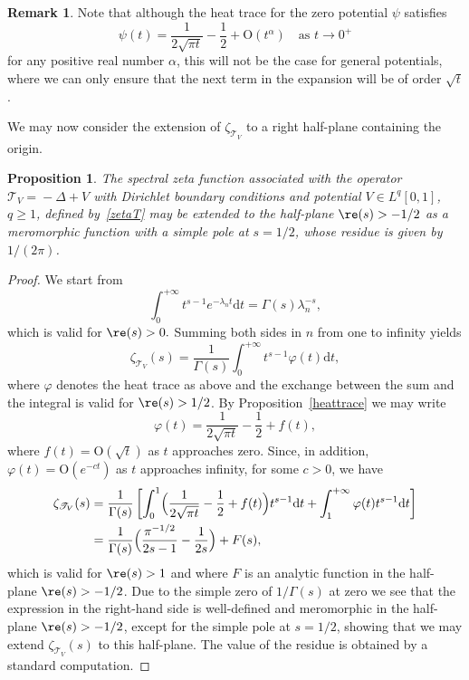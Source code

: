 \documentclass[JEP,XML,SOM,Unicode,NoEqCountersInSection,NoFloatCountersInSection]{cedram}
\theoremstyle{plain}
\newtheorem{prop}[theorem]{Proposition}
\theoremstyle{definition}
\newtheorem{remark}[theorem]{Remark}
\newcommand{\bo}{\mathrm{O}}
\newcommand{\ttt}{\mathscr{T}}
\renewcommand{\d}{\mathrm{d}}
\let\balpha q
\let\fr\frac
\begin{document}
\begin{remark}
Note that although the heat trace for the zero potential $\psi$ satisfies
\[
\psi(t)=\frac{1}{2\sqrt{\pi t}} - \frac{1}{2} + \bo(t^{\alpha}) \quad\text{as } t\to 0^{+}
\]
for any positive real number $\alpha$, this will not be the case for general potentials, where we can only ensure that the next term in the expansion
will be of order $\sqrt{t}$.
\end{remark}

We may now consider the extension of $\zeta_{\ttt_V}$ to a right half-plane containing the origin.

\begin{prop}\label{meromorphicext}
The spectral zeta function associated with the operator \hbox{$\!\ttt_V\!=\!-\Delta\!+\!V$} with Dirichlet boundary conditions and potential $V\in L^{\balpha}[0,1]$, $\balpha\geq 1$,
defined by~\eqref{zetaT} may be extended to the half-plane $\re(s)>-1/2$ as a meromorphic function with a simple pole at $s=1/2$, whose residue is
given by $1/(2\pi)$.
\end{prop}
\begin{proof}
We start from
\[
\int_{0}^{+\infty} t^{s-1} e^{-\lambda_{n}t} \d t = \Gamma(s) \lambda_{n}^{-s},
\]
which is valid for $\re(s)>0.$ Summing both sides in $n$ from one to infinity yields
\[
\zeta_{\ttt_V}(s) = \fr{1}{\Gamma(s)} \int_{0}^{+\infty} t^{s-1} \varphi(t) \d t,
\]
where $\varphi$ denotes the heat trace as above and the exchange between the sum and the integral is valid for $\re(s)>1/2$.
By Proposition~\ref{heattrace} we may write
\[
\varphi(t) = \frac{1}{2\sqrt{\pi t}} - \frac{1}{2} + f(t),
\]
where $f(t) = \bo(\sqrt{t})$ as $t$ approaches zero. Since, in addition, $\varphi(t) = \bo(e^{-ct})$ as $t$ approaches infinity, for some $c>0$, we have
\begin{align*}
\zeta_{\ttt_V}(s) & = \fr{1}{\Gamma(s)}\left[ \int_{0}^{1} \Bigl(\frac{1}{2\sqrt{\pi t}} - \frac{1}{2} + f(t) \Bigr) t^{s-1} \d t +
\int_{1}^{+\infty} \varphi(t) t^{s-1} \d t\right]\\
& = \fr{1}{\Gamma(s)}\Bigl(\fr{\pi^{-1/2}}{2s-1} -\fr{1}{2s} \Bigr) + F(s),
\end{align*}
which is valid for $\re(s)>1$ and where $F$ is an analytic function in the half-plane $\re(s)>-1/2$. Due to the simple zero of $1/\Gamma(s)$
at zero we see that the expression in the right-hand side is well-defined and meromorphic in the half-plane $\re(s)>-1/2$, except for the
simple pole at $s=1/2$, showing that we may extend $\zeta_{\ttt_V}(s)$ to this half-plane. The value of the residue is obtained by a
standard computation.
\end{proof}
\end{document}
